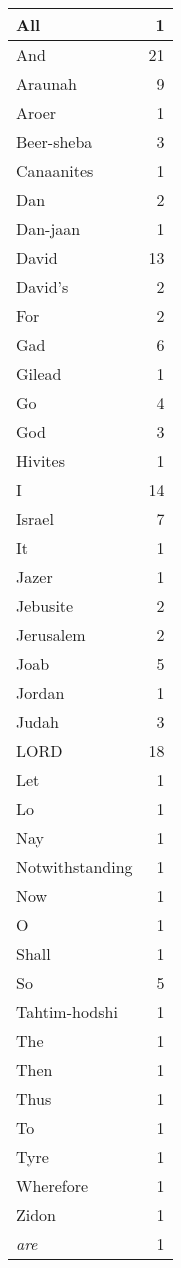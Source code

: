 \begin{center}
\begin{longtable}{l|r}
\hline \hline
\endlastfoot
All & 1 \\ \hline
And & 21 \\ \hline
Araunah & 9 \\ \hline
Aroer & 1 \\ \hline
Beer-sheba & 3 \\ \hline
Canaanites & 1 \\ \hline
Dan & 2 \\ \hline
Dan-jaan & 1 \\ \hline
David & 13 \\ \hline
David's & 2 \\ \hline
For & 2 \\ \hline
Gad & 6 \\ \hline
Gilead & 1 \\ \hline
Go & 4 \\ \hline
God & 3 \\ \hline
Hivites & 1 \\ \hline
I & 14 \\ \hline
Israel & 7 \\ \hline
It & 1 \\ \hline
Jazer & 1 \\ \hline
Jebusite & 2 \\ \hline
Jerusalem & 2 \\ \hline
Joab & 5 \\ \hline
Jordan & 1 \\ \hline
Judah & 3 \\ \hline
LORD & 18 \\ \hline
Let & 1 \\ \hline
Lo & 1 \\ \hline
Nay & 1 \\ \hline
Notwithstanding & 1 \\ \hline
Now & 1 \\ \hline
O & 1 \\ \hline
Shall & 1 \\ \hline
So & 5 \\ \hline
Tahtim-hodshi & 1 \\ \hline
The & 1 \\ \hline
Then & 1 \\ \hline
Thus & 1 \\ \hline
To & 1 \\ \hline
Tyre & 1 \\ \hline
Wherefore & 1 \\ \hline
Zidon & 1 \\ \hline
\emph{are} & 1 \\ \hline

\end{longtable}
\end{center}
